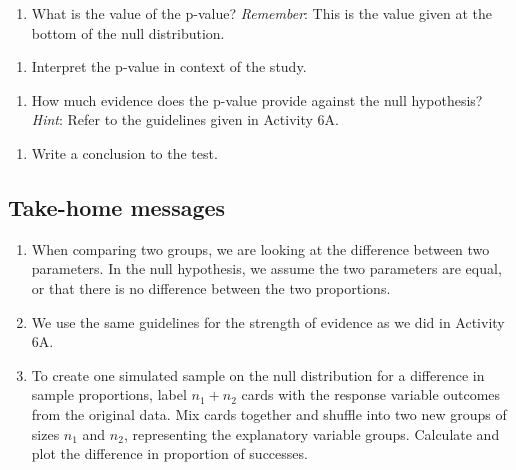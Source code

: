 \documentclass[
]{report}
\providecommand{\tightlist}{%
  \setlength{\itemsep}{0pt}\setlength{\parskip}{0pt}}
\begin{document}
\vspace{.8in}

\begin{enumerate}
\def\labelenumi{\arabic{enumi}.}
\setcounter{enumi}{18}
\tightlist
\item
  What is the value of the p-value? \emph{Remember}: This is the value given at the bottom of the null distribution.
\end{enumerate}

\vspace{0.2in}
\newpage

\begin{enumerate}
\def\labelenumi{\arabic{enumi}.}
\setcounter{enumi}{19}
\tightlist
\item
  Interpret the p-value in context of the study.
\end{enumerate}

\vspace{1in}

\begin{enumerate}
\def\labelenumi{\arabic{enumi}.}
\setcounter{enumi}{20}
\tightlist
\item
  How much evidence does the p-value provide against the null hypothesis? \emph{Hint}: Refer to the guidelines given in Activity 6A.
\end{enumerate}

\vspace{0.4in}

\begin{enumerate}
\def\labelenumi{\arabic{enumi}.}
\setcounter{enumi}{21}
\tightlist
\item
  Write a conclusion to the test.
\end{enumerate}

\vspace{1in}

\hypertarget{take-home-messages-13}{%
\subsection{Take-home messages}\label{take-home-messages-13}}

\begin{enumerate}
\def\labelenumi{\arabic{enumi}.}
\item
  When comparing two groups, we are looking at the difference between two parameters. In the null hypothesis, we assume the two parameters are equal, or that there is no difference between the two proportions.
\item
  We use the same guidelines for the strength of evidence as we did in Activity 6A.
\item
  To create one simulated sample on the null distribution for a difference in sample proportions, label \(n_1 + n_2\) cards with the response variable outcomes from the original data. Mix cards together and shuffle into two new groups of sizes \(n_1\) and \(n_2\), representing the explanatory variable groups. Calculate and plot the difference in proportion of successes.
\end{enumerate}
\end{document}
